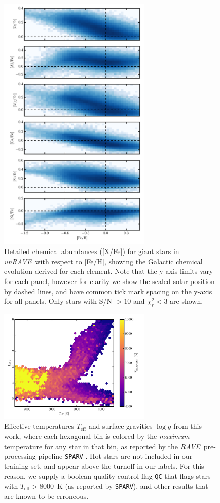 \documentclass[preprint,trackchanges]{aastex}
\newcommand{\acronym}[1]{{\small{#1}}}
\newcommand{\project}[1]{\textsl{#1}}
\newcommand{\rave}{\project{\acronym{RAVE}}}
\newcommand{\unrave}{\project{unRAVE}}
\newcommand{\teff}{T_{\mathrm{eff}}}
\newcommand{\logg}{\log g}
\begin{document}
\begin{figure}[p]
\center
\includegraphics[width=0.65\textwidth]{figures/gce.pdf}
\caption{Detailed chemical abundances ([X/Fe]) for giant stars in \unrave\ with respect to [Fe/H], showing the Galactic chemical evolution derived for each element. Note that the y-axis limits vary for each panel, however for clarity we show the scaled-solar position by dashed lines, and have common tick mark spacing on the y-axis for all panels. Only stars with S/N $> 10$ and $\chi_r^2 < 3$ are shown.\label{fig:gce}}
\end{figure}


\begin{figure}[p]
\center
\includegraphics[width=0.65\textwidth]{figures/hot-stars.pdf}
\caption{Effective temperatures $\teff$ and surface gravities $\logg$ from this work, where each hexagonal bin is colored by the \emph{maximum} temperature for any star in that bin, as reported by the \rave\ pre-processing pipeline \texttt{SPARV} \citep{Steinmetz_2006,Zwitter_2008}.  Hot stars are not included in our training set, and appear above the turnoff in our labels.  For this reason, we supply a boolean quality control flag \texttt{QC} that flags stars with $\teff > 8000$~K (as reported by \texttt{SPARV}), and other results that are known to be erroneous.\label{fig:hot-stars}}
\end{figure}
\end{document}
